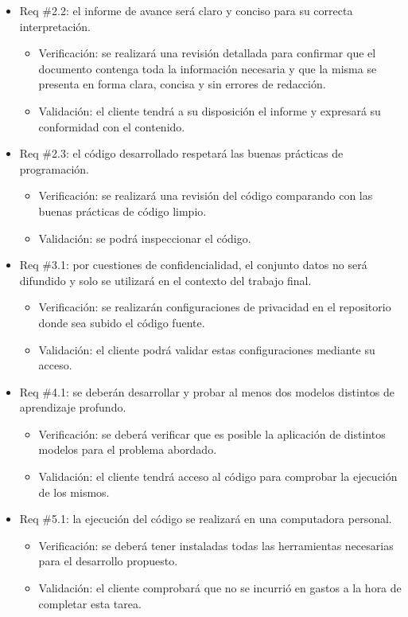 \documentclass[
11pt, %
]{charter}
\begin{document}
\begin{itemize}
\item Req \#2.2: el informe de avance será claro y conciso para su correcta interpretación.
\begin{itemize}
	\item Verificación: se realizará una revisión detallada para confirmar que el documento
    contenga toda la información necesaria y que la misma se presenta en forma clara,
    concisa y sin errores de redacción.
	\item Validación: el cliente tendrá a su disposición el informe y expresará su conformidad
    con el contenido.
\end{itemize}

\item Req \#2.3: el código desarrollado respetará las buenas prácticas de programación.
\begin{itemize}
	\item Verificación: se realizará una revisión del código comparando con las buenas prácticas de código
	 limpio.
	\item Validación: se podrá inspeccionar el código.
\end{itemize}

\item Req \#3.1: por cuestiones de confidencialidad, el conjunto datos no será difundido y solo se
utilizará en el contexto del trabajo final.
\begin{itemize}
	\item Verificación: se realizarán configuraciones de privacidad en el repositorio donde sea subido el código fuente.
	\item Validación: el cliente podrá validar estas configuraciones mediante su acceso.
\end{itemize}

\item Req \#4.1: se deberán desarrollar y probar al menos dos modelos distintos de aprendizaje profundo.
\begin{itemize}
	\item Verificación: se deberá verificar que es posible la aplicación de distintos modelos para el problema abordado.
	\item Validación: el cliente tendrá acceso al código para comprobar la ejecución de los mismos.
\end{itemize}

\item Req \#5.1: la ejecución del código se realizará en una computadora personal.
\begin{itemize}
	\item Verificación: se deberá tener instaladas todas las herramientas necesarias para el desarrollo propuesto.
	\item Validación: el cliente comprobará que no se incurrió en gastos a la hora de completar
    esta tarea.
\end{itemize}


\end{itemize}
\end{document}
